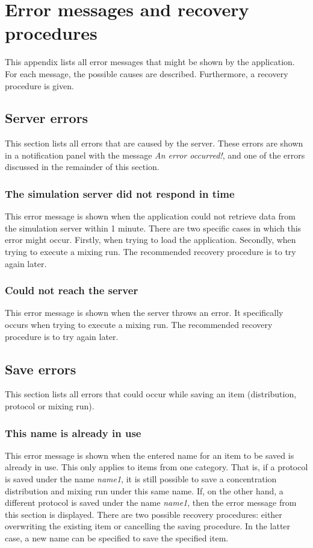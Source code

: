 \chapter{Error messages and recovery procedures}
This appendix lists all error messages that might be shown by the application. For each message, the possible causes are described. Furthermore, a recovery procedure is given.

\section {Server errors}
This section lists all errors that are caused by the server. These errors are shown in a notification panel with the message \emph{An error occurred!}, and one of the errors discussed in the remainder of this section.

\subsection{The simulation server did not respond in time}
This error message is shown when the application could not retrieve data from the simulation server within 1 minute. There are two specific cases in which this error might occur. Firstly, when trying to load the application. Secondly, when trying to execute a mixing run. The recommended recovery procedure is to try again later.

\subsection{Could not reach the server}
This error message is shown when the server throws an error. It specifically occurs when trying to execute a mixing run. The recommended recovery procedure is to try again later.

\section{Save errors}
This section lists all errors that could occur while saving an item (distribution, protocol or mixing run).

\subsection{This name is already in use}
This error message is shown when the entered name for an item to be saved is already in use. This only applies to items from one category. That is, if a protocol is saved under the name \emph{name1}, it is still possible to save a concentration distribution and mixing run under this same name. If, on the other hand, a different protocol is saved under the name \emph{name1}, then the error message from this section is displayed. There are two possible recovery procedures: either overwriting the existing item or cancelling the saving procedure. In the latter case, a new name can be specified to save the specified item.


